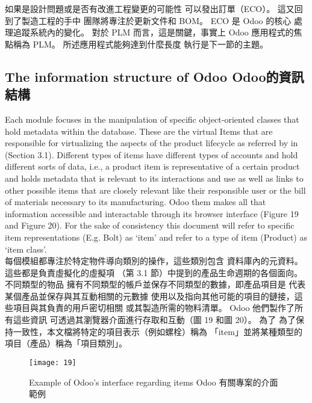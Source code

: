 \fontsize{12}{2.5pt}\sectionef  
{如果是設計問題或是否有改進工程變更的可能性
可以發出訂單（ECO）。 這又回到了製造工程的手中
團隊將專注於更新文件和 BOM。 ECO 是 Odoo 的核心
處理追蹤系統內的變化。 對於 PLM 而言，這是關鍵，事實上
Odoo 應用程式的焦點稱為 PLM。 所述應用程式能夠達到什麼長度
執行是下一節的主題。}
\\[15pt]

\subsection{The information structure of Odoo Odoo的資訊結構 }

\fontsize{12}{2.5pt}\sectionef 
 {Each module focuses in the manipulation of specific object-oriented classes that hold
metadata within the database. These are the virtual Items that are responsible for virtualizing
the aspects of the product lifecycle as referred by in (Section 3.1). Different types of items
have different types of accounts and hold different sorts of data, i.e., a product item is
representative of a certain product and holds metadata that is relevant to its interactions and
use as well as links to other possible items that are closely relevant like their responsible user
or the bill of materials necessary to its manufacturing. Odoo them makes all that information
accessible and interactable through its browser interface (Figure 19 and Figure 20). For the
sake of consistency this document will refer to specific item representations (E.g. Bolt) as
‘item’ and refer to a type of item (Product) as ‘item class’.}\\[1pt]

\fontsize{12}{2.5pt}\sectionef  
{每個模組都專注於特定物件導向類別的操作，這些類別包含
資料庫內的元資料。 這些都是負責虛擬化的虛擬項
（第 3.1 節）中提到的產品生命週期的各個面向。 不同類型的物品
擁有不同類型的帳戶並保存不同類型的數據，即產品項目是
代表某個產品並保存與其互動相關的元數據
使用以及指向其他可能的項目的鏈接，這些項目與其負責的用戶密切相關
或其製造所需的物料清單。 Odoo 他們製作了所有這些資訊
可透過其瀏覽器介面進行存取和互動（圖 19 和圖 20）。 為了
為了保持一致性，本文檔將特定的項目表示（例如螺栓）稱為
「item」並將某種類型的項目（產品）稱為「項目類別」。}\\[15pt]

\begin{figure}[hbt!]
\begin{center}
\texttt{[image: 19]}
\caption{\Large Example of Odoo’s interface regarding items Odoo 有關專案的介面範例}\label{fig.19}
\end{center}
\end{figure}

